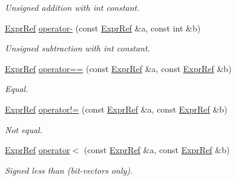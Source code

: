 \begin{DoxyCompactItemize}
\begin{DoxyCompactList}\small\item\em Unsigned addition with int constant. \end{DoxyCompactList}\item 
\mbox{\label{namespaceilang_a86888214d74c96271cda87a4f13c9dfc}} 
\mbox{\hyperlink{classilang_1_1_expr_ref}{Expr\+Ref}} \mbox{\hyperlink{namespaceilang_a86888214d74c96271cda87a4f13c9dfc}{operator-\/}} (const \mbox{\hyperlink{classilang_1_1_expr_ref}{Expr\+Ref}} \&a, const int \&b)
\begin{DoxyCompactList}\small\item\em Unsigned subtraction with int constant. \end{DoxyCompactList}\item 
\mbox{\label{namespaceilang_acb9b38a78f3d3d10857d632479e1a1f6}} 
\mbox{\hyperlink{classilang_1_1_expr_ref}{Expr\+Ref}} \mbox{\hyperlink{namespaceilang_acb9b38a78f3d3d10857d632479e1a1f6}{operator==}} (const \mbox{\hyperlink{classilang_1_1_expr_ref}{Expr\+Ref}} \&a, const \mbox{\hyperlink{classilang_1_1_expr_ref}{Expr\+Ref}} \&b)
\begin{DoxyCompactList}\small\item\em Equal. \end{DoxyCompactList}\item 
\mbox{\label{namespaceilang_a43c51f6da7b4a7d2e0bb4e5e06300bfb}} 
\mbox{\hyperlink{classilang_1_1_expr_ref}{Expr\+Ref}} \mbox{\hyperlink{namespaceilang_a43c51f6da7b4a7d2e0bb4e5e06300bfb}{operator!=}} (const \mbox{\hyperlink{classilang_1_1_expr_ref}{Expr\+Ref}} \&a, const \mbox{\hyperlink{classilang_1_1_expr_ref}{Expr\+Ref}} \&b)
\begin{DoxyCompactList}\small\item\em Not equal. \end{DoxyCompactList}\item 
\mbox{\label{namespaceilang_af297d9e26e0499970d9ec654667861db}} 
\mbox{\hyperlink{classilang_1_1_expr_ref}{Expr\+Ref}} \mbox{\hyperlink{namespaceilang_af297d9e26e0499970d9ec654667861db}{operator$<$}} (const \mbox{\hyperlink{classilang_1_1_expr_ref}{Expr\+Ref}} \&a, const \mbox{\hyperlink{classilang_1_1_expr_ref}{Expr\+Ref}} \&b)
\begin{DoxyCompactList}\small\item\em Signed less than (bit-\/vectors only). \end{DoxyCompactList}\item 

\end{DoxyCompactItemize}
